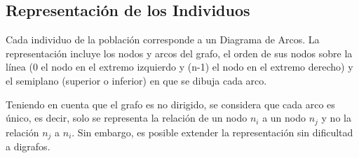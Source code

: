 	\subsection{Representación de  los Individuos}
	\label{subsec:representacion_individuos}
	Cada individuo de la población corresponde a un Diagrama de Arcos. La representación incluye  los nodos y arcos del grafo, el orden de sus nodos sobre la línea (0 el nodo en el extremo izquierdo y  (n-1) el nodo en el extremo derecho) y el semiplano   (superior o inferior) en que se dibuja cada arco.
	
	
	
	
	
	
	Teniendo en cuenta que  el grafo es  no dirigido, se considera que cada arco es único, es decir, solo se representa la relación de un nodo $n_i$ a un nodo $n_j$ y no la relación $n_j$ a $n_i$. Sin embargo, es posible extender la representación sin dificultad a digrafos.
	
